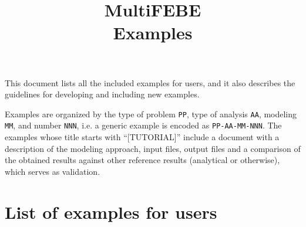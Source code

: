 \documentclass{article}
\title{MultiFEBE \\ Examples}
\author{}
\date{}
\begin{document}
\maketitle

This document lists all the included examples for users, and it also describes the guidelines for developing and including new examples. 

Examples are organized by the type of problem \texttt{PP}, type of analysis \texttt{AA}, modeling \texttt{MM}, and number \texttt{NNN}, i.e. a generic example is encoded as \texttt{PP-AA-MM-NNN}. The examples whose title starts with ``[TUTORIAL]'' include a document with a description of the modeling approach, input files, output files and a comparison of the obtained results against other reference results (analytical or otherwise), which serves as validation.

\section{List of examples for users}
\end{document}
